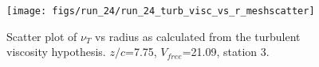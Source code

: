 \begin{figure}[H]
\centering
\texttt{[image: figs/run\_24/run\_24\_turb\_visc\_vs\_r\_meshscatter]}
\caption{Scatter plot of $\nu_T$ vs radius as calculated from the turbulent viscosity hypothesis. $z/c$=7.75, $V_{free}$=21.09, station 3.}
\label{fig:run_24_turb_visc_vs_r_meshscatter}
\end{figure}



